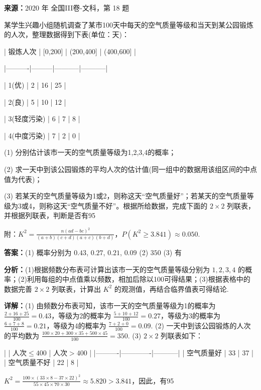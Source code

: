 \begin{question}[points=12]
\textbf{来源：}2020 年 全国III卷-文科，第 18 题\par
某学生兴趣小组随机调查了某市100天中每天的空气质量等级和当天到某公园锻炼的人次，整理数据得到下表(单位：天)：



| 锻炼人次 | [0,200] | (200,400] | (400,600] |

|----------|---------|-----------|-----------|

| 1(优)    | 2       | 16        | 25        |

| 2(良)    | 5       | 10        | 12        |

| 3(轻度污染) | 6    | 7         | 8         |

| 4(中度污染) | 7    | 2         | 0         |



(1) 分别估计该市一天的空气质量等级为1,2,3,4的概率；

(2) 求一天中到该公园锻炼的平均人次的估计值(同一组中的数据用该组区间的中点值为代表)；

(3) 若某天的空气质量等级为1或2，则称这天“空气质量好”；若某天的空气质量等级为3或4，则称这天“空气质量不好”。根据所给数据，完成下面的 $2\times2$ 列联表，并根据列联表，判断是否有95%



附：$K^2=\frac{n(ad-bc)^2}{(a+b)(c+d)(a+c)(b+d)}$，$P(K^2\geq3.841)\approx0.050$.
\begin{solution}
\textbf{答案：}(1) 概率分别为 $0.43$, $0.27$, $0.21$, $0.09$ (2) $350$ (3) 有

\textbf{分析：}(1)根据频数分布表可计算出该市一天的空气质量等级分别为 $1,2,3,4$ 的概率；(2)利用每组的中点值乘以频数，相加后除以100可得结果；(3)根据表格中的数据完善 $2\times2$ 列联表，计算出 $K^2$ 的观测值，再结合临界值表可得结论.

\textbf{详解：}(1) 由频数分布表可知，该市一天的空气质量等级为1的概率为 $\frac{2+16+25}{100}=0.43$，等级为2的概率为 $\frac{5+10+12}{100}=0.27$，等级为3的概率为 $\frac{6+7+8}{100}=0.21$，等级为4的概率为 $\frac{7+2+0}{100}=0.09$.
(2) 一天中到该公园锻炼的人次的平均数为 $\frac{100\times20+300\times35+500\times45}{100}=350$.
(3) $2\times2$ 列联表如下：

|          | 人次$\leq400$ | 人次$>400$ |
|----------|-------------|-----------|
| 空气质量好 | 33          | 37        |
| 空气质量不好 | 22          | 8         |

$K^2=\frac{100\times(33\times8-37\times22)^2}{55\times45\times70\times30}\approx5.820>3.841$，因此，有95%
\end{solution}
\end{question}

